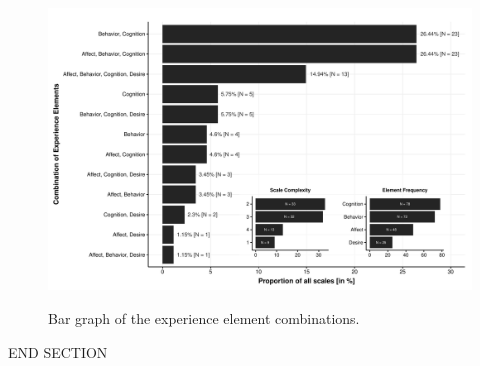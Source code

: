 \begin{figure}[h]
\centering
\caption{Bar graph of the experience element combinations.}
\includegraphics[width=\textwidth]{Figures/ABCDFreq-1}
\label{fig:ElementsScales}
\end{figure}



END SECTION
